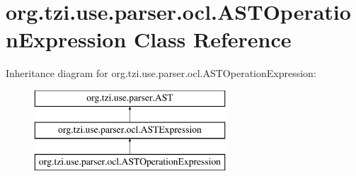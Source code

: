 \hypertarget{classorg_1_1tzi_1_1use_1_1parser_1_1ocl_1_1_a_s_t_operation_expression}{\section{org.\-tzi.\-use.\-parser.\-ocl.\-A\-S\-T\-Operation\-Expression Class Reference}
\label{classorg_1_1tzi_1_1use_1_1parser_1_1ocl_1_1_a_s_t_operation_expression}
}
Inheritance diagram for org.\-tzi.\-use.\-parser.\-ocl.\-A\-S\-T\-Operation\-Expression\-:\begin{figure}[H]
\begin{center}
\leavevmode
\includegraphics[height=3.000000cm]{classorg_1_1tzi_1_1use_1_1parser_1_1ocl_1_1_a_s_t_operation_expression}
\end{center}
\end{figure}

